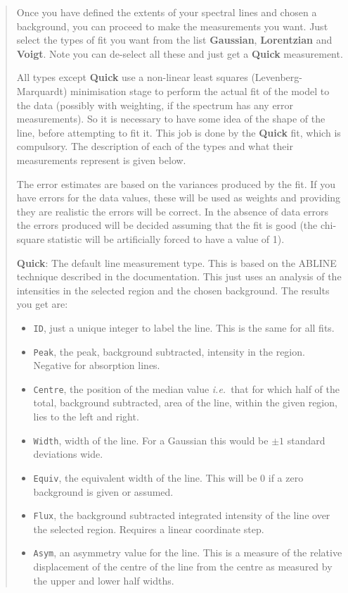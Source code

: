 \documentclass[twoside,11pt,nolof]{starlink}
\newcommand{\labelitem}[1]{\textbf{#1}}
\providecommand{\hitext}[1]{\texttt{#1}}
\providecommand{\ie}{\textit{i.e.}}
\begin{document}
\begin{quote}
 Once you have defined the extents of your spectral lines and chosen a
 background, you can proceed to make the measurements you want. Just
 select the types of fit you want from the list \labelitem{Gaussian},
 \labelitem{Lorentzian} and \labelitem{Voigt}. Note you can de-select
 all these and just get a \labelitem{Quick} measurement.

 All types except \labelitem{Quick} use a non-linear least squares
 (Levenberg-Marquardt) minimisation stage to perform the actual fit of
 the model to the data (possibly with weighting, if the spectrum has
 any error measurements). So it is necessary to have some idea of the
 shape of the line, before attempting to fit it. This job is done by
 the \labelitem{Quick} fit, which is compulsory. The description of
 each of the types and what their measurements represent is given
 below.

 The error estimates are based on the variances produced by the fit.
 If you have errors for the data values, these will be used as weights
 and providing they are realistic the errors will be correct. In the
 absence of data errors the errors produced will be decided assuming
 that the fit is good (the chi-square statistic will be artificially
 forced to have a value of 1).

 \labelitem{Quick}: The default line measurement type. This is based on
 the ABLINE technique described in the 
 documentation. This just uses an analysis of the intensities in the
 selected region and the chosen background. The results you get are:
 \begin{itemize}
   \item \hitext{ID}, just a unique integer to label the line. This is
         the same for all fits.
   \item \hitext{Peak}, the peak, background subtracted, intensity in
         the region. Negative for absorption lines.
   \item \hitext{Centre}, the position of the median value \ie\ that
         for which half of the total, background subtracted, area of
         the line, within the given region, lies to the left and right.
   \item \hitext{Width}, width of the line. For a Gaussian this would
         be $\pm 1$ standard deviations wide.
   \item \hitext{Equiv}, the equivalent width of the line. This will be
         $0$ if a zero background is given or assumed.
   \item \hitext{Flux}, the background subtracted integrated intensity
         of the line over the selected region. Requires a linear
         coordinate step.
   \item \hitext{Asym}, an asymmetry value for the line. This is a
         measure of the relative displacement of the centre of the
         line from the centre as measured by the upper and lower
         half widths.
 \end{itemize}


\end{quote}
\end{document}
